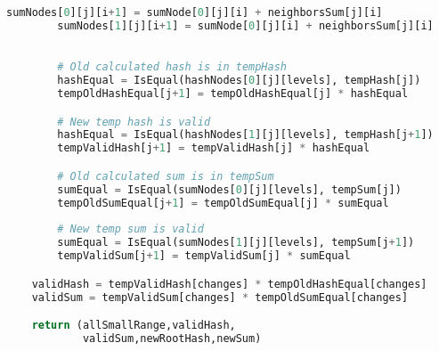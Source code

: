 \begin{lstlisting}[language=Python, caption=Liabilities change circuit pseudocode]
        sumNodes[0][j][i+1] = sumNode[0][j][i] + neighborsSum[j][i]
        sumNodes[1][j][i+1] = sumNode[0][j][i] + neighborsSum[j][i]
            

        # Old calculated hash is in tempHash
        hashEqual = IsEqual(hashNodes[0][j][levels], tempHash[j])
        tempOldHashEqual[j+1] = tempOldHashEqual[j] * hashEqual

        # New temp hash is valid
        hashEqual = IsEqual(hashNodes[1][j][levels], tempHash[j+1])
        tempValidHash[j+1] = tempValidHash[j] * hashEqual

        # Old calculated sum is in tempSum
        sumEqual = IsEqual(sumNodes[0][j][levels], tempSum[j])
        tempOldSumEqual[j+1] = tempOldSumEqual[j] * sumEqual
        
        # New temp sum is valid
        sumEqual = IsEqual(sumNodes[1][j][levels], tempSum[j+1])
        tempValidSum[j+1] = tempValidSum[j] * sumEqual

    validHash = tempValidHash[changes] * tempOldHashEqual[changes]
    validSum = tempValidSum[changes] * tempOldSumEqual[changes]

    return (allSmallRange,validHash, 
            validSum,newRootHash,newSum)
    
\end{lstlisting}
